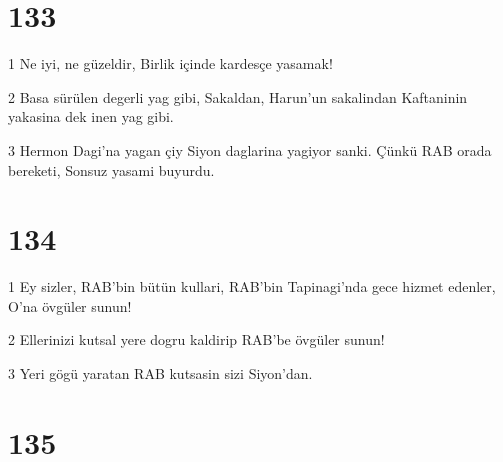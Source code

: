 \chapter{133}

\par 1 Ne iyi, ne güzeldir, Birlik içinde kardesçe yasamak!
\par 2 Basa sürülen degerli yag gibi, Sakaldan, Harun'un sakalindan Kaftaninin yakasina dek inen yag gibi.
\par 3 Hermon Dagi'na yagan çiy Siyon daglarina yagiyor sanki. Çünkü RAB orada bereketi, Sonsuz yasami buyurdu.

\chapter{134}

\par 1 Ey sizler, RAB'bin bütün kullari, RAB'bin Tapinagi'nda gece hizmet edenler, O'na övgüler sunun!
\par 2 Ellerinizi kutsal yere dogru kaldirip RAB'be övgüler sunun!
\par 3 Yeri gögü yaratan RAB kutsasin sizi Siyon'dan.

\chapter{135}

